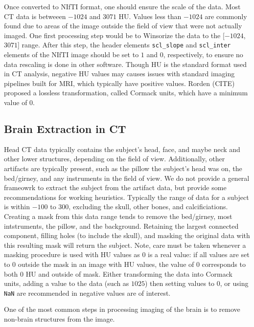 \documentclass[]{elsarticle} %
\begin{document}
Once converted to NIfTI format, one should ensure the scale of the data.
Most CT data is betweeen \(-1024\) and \(3071\) HU. Values less than
\(-1024\) are commonly found due to areas of the image outside the field
of view that were not actually imaged. One first processing step would
be to Winsorize the data to the {[}\(-1024\), \(3071\){]} range. After
this step, the header elements \texttt{scl\_slope} and
\texttt{scl\_inter} elements of the NIfTI image should be set to \(1\)
and \(0\), respectively, to ensure no data rescaling is done in other
software. Though HU is the standard format used in CT analysis, negative
HU values may causes issues with standard imaging pipelines built for
MRI, which typically have positive values. Rorden (CITE) proposed a
lossless transformation, called Cormack units, which have a minimum
value of \(0\).

\hypertarget{brain-extraction-in-ct}{%
\subsection{Brain Extraction in CT}\label{brain-extraction-in-ct}}

Head CT data typically contains the subject's head, face, and maybe neck
and other lower structures, depending on the field of view.
Additionally, other artifacts are typically present, such as the pillow
the subject's head was on, the bed/girney, and any instruments in the
field of view. We do not provide a general frameowrk to extract the
subject from the artifact data, but provide some recommendations for
working heuristics. Typically the range of data for a subject is within
\(-100\) to \(300\), excluding the skull, other bones, and
calcificiations. Creating a mask from this data range tends to remove
the bed/girney, most intstruments, the pillow, and the background.
Retaining the largest connected component, filling holes (to include the
skull), and masking the original data with this resulting mask will
return the subject. Note, care must be taken whenever a masking
procedure is used with HU values as \(0\) is a real value: if all values
are set to \(0\) outside the mask in an image with HU values, the value
of \(0\) corresponds to both \(0\) HU and outside of mask. Either
transforming the data into Cormack units, adding a value to the data
(such as \(1025\)) then setting values to \(0\), or using \texttt{NaN}
are recommended in negative values are of interest.

One of the most common steps in processing imaging of the brain is to
remove non-brain structures from the image.
\end{document}
